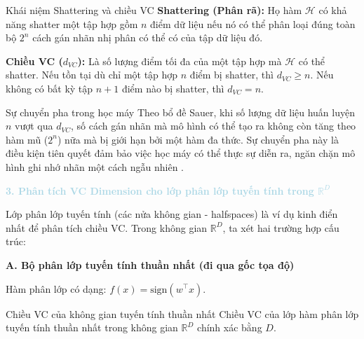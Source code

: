 \begin{infobox}{Khái niệm Shattering và chiều VC}
\textbf{Shattering (Phân rã):} Họ hàm $\mathcal{H}$ có khả năng shatter một tập hợp gồm $n$ điểm dữ liệu nếu nó có thể phân loại đúng toàn bộ $2^n$ cách gán nhãn nhị phân có thể có của tập dữ liệu đó.

\textbf{Chiều VC ($d_{VC}$):} Là số lượng điểm tối đa của một tập hợp mà $\mathcal{H}$ có thể shatter. Nếu tồn tại dù chỉ một tập hợp $n$ điểm bị shatter, thì $d_{VC} \ge n$. Nếu không có bất kỳ tập $n+1$ điểm nào bị shatter, thì $d_{VC} = n$.
\end{infobox}

\begin{notebox}{Sự chuyển pha trong học máy}
Theo bổ đề Sauer, khi số lượng dữ liệu huấn luyện $n$ vượt qua $d_{VC}$, số cách gán nhãn mà mô hình có thể tạo ra không còn tăng theo hàm mũ ($2^n$) nữa mà bị giới hạn bởi một hàm đa thức. Sự chuyển pha này là điều kiện tiên quyết đảm bảo việc học máy có thể thực sự diễn ra, ngăn chặn mô hình ghi nhớ nhãn một cách ngẫu nhiên \cite{gerbelot2023applying}.
\end{notebox}

\vspace{0.5em}
\noindent\textcolor{lightblue}{\textbf{3. Phân tích VC Dimension cho lớp phân lớp tuyến tính trong $\mathbb{R}^D$}}
\vspace{0.5em}

Lớp phân lớp tuyến tính (các nửa không gian - halfspaces) là ví dụ kinh điển nhất để phân tích chiều VC. Trong không gian $\mathbb{R}^D$, ta xét hai trường hợp cấu trúc:

\textbf{A. Bộ phân lớp tuyến tính thuần nhất (đi qua gốc tọa độ)}

Hàm phân lớp có dạng: $f(x) = \text{sign}(w^\top x)$.

\begin{importantbox}{Chiều VC của không gian tuyến tính thuần nhất}
Chiều VC của lớp hàm phân lớp tuyến tính thuần nhất trong không gian $\mathbb{R}^D$ chính xác bằng $D$.
\end{importantbox}

